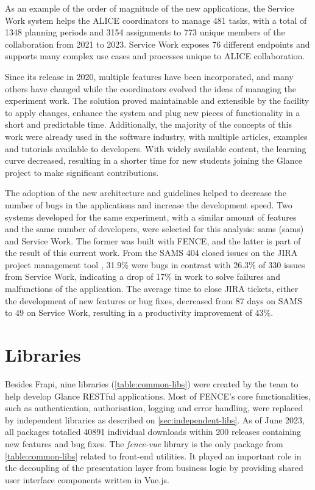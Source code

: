 As an example of the order of magnitude of the new applications, the Service Work system helps the ALICE coordinators to manage 481 tasks, with a total of 1348 planning periods and 3154 assignments to 773 unique members of the collaboration from 2021 to 2023. Service Work exposes 76 different endpoints and supports many complex use cases and processes unique to ALICE collaboration.

Since its release in 2020, multiple features have been incorporated, and many others have changed while the coordinators evolved the ideas of managing the experiment work. The solution proved maintainable and extensible by the facility to apply changes, enhance the system and plug new pieces of functionality in a short and predictable time. Additionally, the majority of the concepts of this work were already used in the software industry, with multiple articles, examples and tutorials available to developers. With widely available content, the learning curve decreased, resulting in a shorter time for new students joining the Glance project to make significant contributions.

The adoption of the new architecture and guidelines helped to decrease the number of bugs in the applications and increase the development speed. Two systems developed for the same experiment, with a similar amount of features and the same number of developers, were selected for this analysis: \acrshort{sams} (\acrlong{sams}) \cite{heron-tcc} and Service Work. The former was built with FENCE, and the latter is part of the result of this current work. From the SAMS 404 closed issues on the JIRA project management tool \cite{jira}, 31.9\% were bugs in contrast with 26.3\% of 330 issues from Service Work, indicating a drop of 17\% in work to solve failures and malfunctions of the application. The average time to close JIRA tickets, either the development of new features or bug fixes, decreased from 87 days on SAMS to 49 on Service Work, resulting in a productivity improvement of 43\%.

\section{Libraries}

Besides Frapi, nine libraries (\autoref{table:common-libs}) were created by the team to help develop Glance RESTful applications. Most of FENCE's core functionalities, such as authentication, authorisation, logging and error handling, were replaced by independent libraries as described on \autoref{sec:independent-libs}. As of June 2023, all packages totalled 40891 individual downloads within 200 releases containing new features and bug fixes. The \textit{fence-vue} \cite{fence-vue} \cite{de-jesus-tcc} library is the only package from \autoref{table:common-libs} related to front-end utilities. It played an important role in the decoupling of the presentation layer from business logic by providing shared user interface components written in Vue.js.

